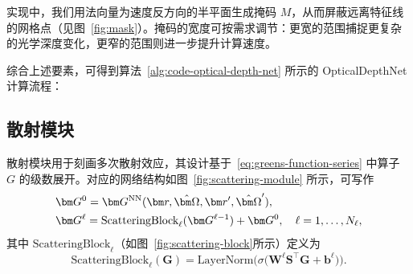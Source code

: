 实现中，我们用法向量为速度反方向的半平面生成掩码 $M$，从而屏蔽远离特征线的网格点（见图~\ref{fig:mask}）。掩码的宽度可按需求调节：更宽的范围捕捉更复杂的光学深度变化，更窄的范围则进一步提升计算速度。

综合上述要素，可得到算法~\ref{alg:code-optical-depth-net} 所示的 OpticalDepthNet 计算流程：







\subsection{散射模块}\label{sec:scattering-module}
散射模块用于刻画多次散射效应，其设计基于~\eqref{eq:greens-function-series} 中算子 $G$ 的级数展开。对应的网络结构如图~\ref{fig:scattering-module} 所示，可写作
\begin{equation}
    \begin{aligned}
         & \bG^{0} = \bG^{\text{NN}}(\br,\bOmega,\br^{\prime},\bOmega^{\prime}),                               \\
         & \bG^{\ell}  = \text{ScatteringBlock}_{\ell}(\bG^{\ell-1}) + \bG^{0}, \quad \ell = 1,\dots,N_{\ell},
    \end{aligned}
\end{equation}
其中 $\text{ScatteringBlock}_\ell$（如图~\ref{fig:scattering-block}所示）定义为
\begin{equation}\label{eq:scattering-block}
    \text{ScatteringBlock}_\ell(\bm{G}) = \text{LayerNorm}\Big(\sigma\Big(\bm{W}^{\ell} \bm{S}^{\top} \bm{G} + \bm{b}^{\ell}\Big)\Big).
\end{equation}

